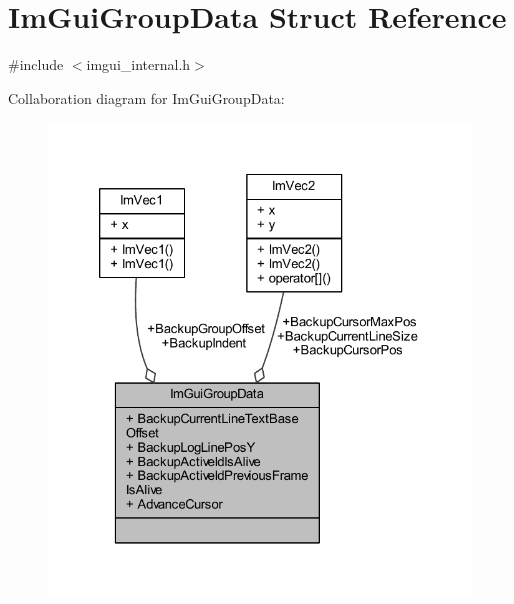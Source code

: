 \hypertarget{struct_im_gui_group_data}{}\section{Im\+Gui\+Group\+Data Struct Reference}
\label{struct_im_gui_group_data}


{\ttfamily \#include $<$imgui\+\_\+internal.\+h$>$}



Collaboration diagram for Im\+Gui\+Group\+Data\+:
\nopagebreak
\begin{figure}[H]
\begin{center}
\leavevmode
\includegraphics[width=326pt]{struct_im_gui_group_data__coll__graph}
\end{center}
\end{figure}
